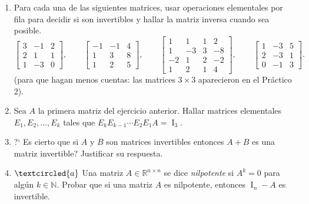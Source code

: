 \begin{enumerate}[topsep=6pt,itemsep=.4cm]


\item\label{ej:inversas} Para cada una de las siguientes matrices, usar operaciones elementales
por fila para decidir si son invertibles y hallar la matriz inversa cuando sea posible.
\begin{equation*}
\begin{bmatrix} 3 & -1 & 2 \\ 2 & 1 & 1 \\ 1 & -3 & 0\end{bmatrix},\qquad
\begin{bmatrix} -1 & -1 &4 \\ 1 & 3 & 8 \\ 1 & 2 & 5\end{bmatrix},\qquad
\begin{bmatrix} 1 & 1 & 1 & 2 \\ 1 & -3 & 3 & -8 \\ -2 & 1 & 2 & -2 \\ 1 & 2 & 1 & 4 \end{bmatrix},\qquad
\begin{bmatrix} 1 & -3 & 5 \\ 2 & -3 & 1 \\ 0 & -1 & 3 \end{bmatrix}.
\end{equation*}
(para que hagan menos cuentas: las matrices $3\times3$ aparecieron en el Pr\'actico 2).


\item Sea $A$ la primera matriz del ejercicio anterior.
Hallar matrices elementales $E_1,E_2,\dots,E_k$ tales que $E_kE_{k-1}\cdots E_2E_1A=\operatorname{I}_3$.


\item ?` Es cierto que si $A$ y $B$ son matrices invertibles entonces $A+B$ es una matriz invertible? Justificar su respuesta.

\item\label{nilpotene - id} $\textcircled{a}$ Una matriz $A\in\mathbb{R}^{n\times n}$ se dice \emph{nilpotente} si $A^k=0$ para alg\'un $k\in\mathbb{N}$.
Probar que si una matriz $A$ es nilpotente, entonces  $\operatorname{I}_n - A$  es invertible.



\end{enumerate}
